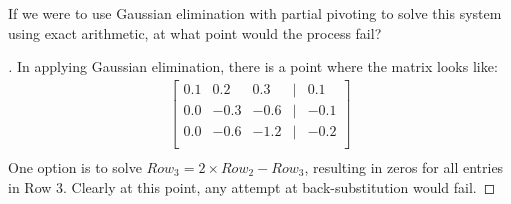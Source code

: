 \documentclass[12pt]{article}
\newenvironment{exercise}[2][Exercise]{\begin{trivlist}
\item[\hskip \labelsep {\bfseries #1}\hskip \labelsep {\bfseries #2.}]}{\end{trivlist}}
\begin{document}
\begin{exercise}{2}
	If we were to use Gaussian elimination with partial pivoting to solve this system using exact arithmetic, at what point would the process fail?
\end{exercise}

\begin{proof}[]
	In applying Gaussian elimination, there is a point where the matrix looks like: \\
	\begin{align*}
	\begin{bmatrix}
		0.1 & 0.2 & 0.3 & | & 0.1 \\
		0.0 & -0.3 & -0.6 & | & -0.1 \\
		0.0 & -0.6 & -1.2 & | & -0.2 \\
	\end{bmatrix}  \\
	\end{align*}
	One option is to solve $Row_3 = 2 \times Row_2 - Row_3$, resulting in zeros for all entries in Row 3. Clearly at this point, any attempt at back-substitution would fail.
\end{proof}
\end{document}
